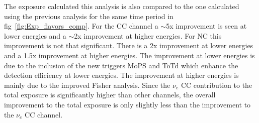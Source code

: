 The exposure calculated this analysis is also compared to the one calculated using the previous analysis for the same time period in fig~\ref{fig:Exp_flavors_comp}. For the CC channel a $\sim$5x improvement is seen at lower energies and a $\sim$2x improvement at higher energies. For NC this improvement is not that significant. There is a 2x improvement at lower energies and a 1.5x improvement at higher energies. The improvement at lower energies is due to the inclusion of the new triggers MoPS and ToTd which enhance the detection efficiency at lower energies. The improvement at higher energies is mainly due to the improved Fisher analysis. Since the $\nu_e$ CC contribution to the total exposure is significantly higher than other channels, the overall improvement to the total exposure is only slightly less than the improvement to the $\nu_e$ CC channel. 

